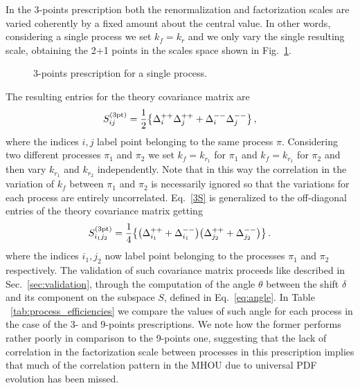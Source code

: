 %
In the 3-points prescription both the renormalization and factorization scales are varied coherently by a fixed amount about the
central value.
In other words, considering a single process we set $k_f=k_r$ and we only vary the single resulting scale, obtaining the
2+1 points in the scales space shown in Fig.~\ref{fig:3-points}.
\begin{figure}[t]
    \centering
    {}\qquad
    \begin{caption}{3-points prescription for a single process.}
      \label{fig:3-points}
    \end{caption}
\end{figure}
The resulting entries for the theory covariance matrix are 
\begin{align}
    \label{3S}
    S^{(\rm 3pt)}_{ij} = \frac{1}{2}\big\{ \Delta_i^{++}\Delta_j^{++}  + \Delta_i^{--}\Delta_j^{--}\big\} \, ,
\end{align}
where the indices $i,j$ label point belonging to the same process $\pi$.
Considering two different processes $\pi_1$ and $\pi_2$ we set $k_f=k_{r_1}$ for $\pi_1$ and $k_f=k_{r_1}$ for $\pi_2$
and then vary $k_{r_1}$ and $k_{r_2}$ independently. Note that in this way the correlation in the variation of $k_f$
between $\pi_1$ and $\pi_2$ is necessarily ignored so that the variations for each process are entirely uncorrelated.
Eq.~\eqref{3S} is generalized to the off-diagonal entries of the theory covariance matrix getting
\begin{equation}
    S^{(\rm 3pt)}_{i_1j_2} = 
    \frac{1}{4}\big\{\big(\Delta_{i_1}^{++} + \Delta_{i_1}^{--} \big) \big(\Delta_{j_2}^{++} + \Delta_{j_2}^{--} \big) \big\}\, .
\end{equation}
where the indices $i_1,j_2$ now label point belonging to the processes $\pi_1$ and $\pi_2$ respectively.
The validation of such covariance matrix proceeds like described in Sec.~\ref{sec:validation},
through the computation of the angle $\theta$ between the shift $\delta$ and its component on the
subspace $S$, defined in Eq.~\eqref{eq:angle}. In Table ~\ref{tab:process_efficiencies} 
we compare the values of such angle for each process in the case of the 3- and 9-points prescriptions.
We note how the former performs rather poorly in comparison to the 9-points one,
suggesting that the lack of correlation in the factorization scale between processes in this prescription
implies that much of the correlation pattern in the MHOU due to universal PDF evolution has been missed.
\begin{table}[ht!]
	\centering
	\small
	
        \vspace{3mm}
	\caption{Comparison between the $\theta$ values for the 3- and 9-points prescriptions.}
	\label{tab:process_efficiencies}
\end{table}

